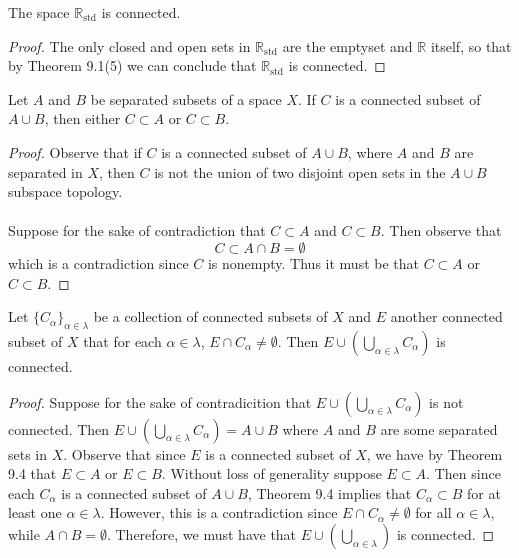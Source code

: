 \documentclass[a4paper,12pt,twoside]{hmcpset}
\begin{document}
\begin{problem}[Theorem 9.3]
    The space $\mathbb{R}_{\text{std}}$ is connected.
\end{problem}

\begin{proof}
    The only closed and open sets in $\mathbb{R}_{\text{std}}$ are the
    emptyset and $\mathbb{R}$ itself, so that by Theorem 9.1(5) we
    can conclude that $\mathbb{R}_\text{std}$ is connected. 
\end{proof}


\begin{problem}[Theorem 9.4]
    Let $A$ and $B$ be separated subsets of a space $X$. If $C$ is a
    connected subset of $A \cup B$, then either $C \subset A$ or $C
    \subset B$.
\end{problem}

\begin{proof}
    Observe that if $C$ is a connected subset of $A \cup B$, where $A$
    and $B$ are separated in $X$, then $C$ is not the union of two
    disjoint open sets in the $A \cup B$ subspace topology. 
    \\
    \\
    Suppose for the sake of contradiction that $C \subset A$ and $C
    \subset B$. Then observe that 
    \[
       C \subset A \cap B = \emptyset   
    \]
    which is a contradiction since $C$ is nonempty. Thus it must be
    that $C \subset A$ or $C \subset B$.

\end{proof}

\begin{problem}[Theorem 9.5]
    Let $\{C_{\alpha}\}_{\alpha \in \lambda}$ be a collection of
    connected subsets of $X$ and $E$ another connected subset of $X$
    that for each $\alpha \in \lambda$, $E \cap C_{\alpha} \ne
    \emptyset$. Then $\displaystyle E \cup (\bigcup\limits_{\alpha \in \lambda}
    C_{\alpha})$ is connected.
\end{problem}

\begin{proof}
    Suppose for the sake of contradicition that $E \cup
    (\bigcup\limits_{\alpha \in \lambda}C_\alpha)$ is not connected. 
    Then $E \cup (\bigcup\limits_{\alpha \in \lambda}C_\alpha) = A \cup B$
    where $A$ and $B$ are some separated sets in $X$. Observe that
    since $E$ is a connected subset of $X$, we have by Theorem 9.4
    that $E \subset A$ or $E \subset B$. Without loss of generality
    suppose $E \subset A$. Then since each $C_\alpha$ is a connected
    subset of $A \cup B$, Theorem 9.4 implies that 
    $C_\alpha \subset B$ for at least one
    $\alpha \in \lambda$. However, this is a contradiction since $E
    \cap C_\alpha \ne \emptyset$ for all $\alpha \in \lambda$, while
    $A \cap B = \emptyset.$ Therefore, we must have that 
    $E \cup (\bigcup\limits_{\alpha \in \lambda})$ is connected. 
\end{proof}
\end{document}
